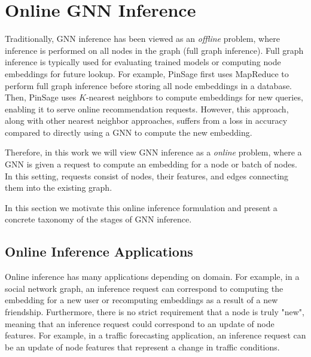 \section{Online GNN Inference}
Traditionally, GNN inference has been viewed as an \textit{offline} problem, where inference is performed on all nodes in the graph (full graph inference).
Full graph inference is typically used for evaluating trained models or computing node embeddings for future lookup. 
For example, PinSage \cite{Recsys_PinSAGE_2018} first uses MapReduce \cite{MapReduce_2004} to perform full graph inference before storing all node embeddings in a database.
Then, PinSage uses $K$-nearest neighbors to compute embeddings for new queries, enabling it to serve online recommendation requests.
However, this approach, along with other nearest neighbor approaches, suffers from a loss in accuracy compared to directly using a GNN to compute the new embedding.

Therefore, in this work we will view GNN inference as a \textit{online} problem, where a GNN is given a request to compute an embedding for a node or batch of nodes. In this setting, requests consist of nodes, their features, and edges connecting them into the existing graph.

In this section we motivate this online inference formulation and present a concrete taxonomy of the stages of GNN inference.

\subsection{Online Inference Applications}
Online inference has many applications depending on domain.
For example, in a social network graph, an inference request can correspond to computing the embedding for a new user or recomputing embeddings as a result of a new friendship. 
Furthermore, there is no strict requirement that a node is truly "new", meaning that an inference request could correspond to an update of node features.
For example, in a traffic forecasting application, an inference request can be an update of node features that represent a change in traffic conditions.


